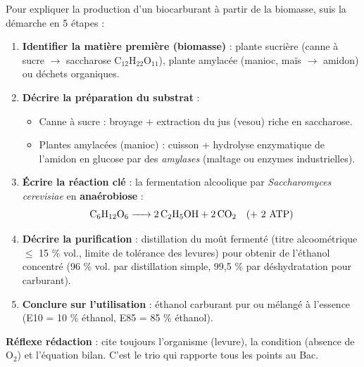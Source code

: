 \documentclass[11pt]{article}
\newcommand{\cle}[1]{{\popxbold\color{popdark}#1}}
\begin{document}
\begin{methode}
Pour expliquer la production d'un biocarburant à partir de la biomasse, suis la démarche en 5 étapes :
\begin{enumerate}
\item \textbf{Identifier la matière première (biomasse)} : plante sucrière (canne à sucre $\rightarrow$ \cle{saccharose} $\mathrm{C_{12}H_{22}O_{11}}$), plante amylacée (manioc, maïs $\rightarrow$ \cle{amidon}) ou déchets organiques.
\item \textbf{Décrire la préparation du substrat} :
\begin{itemize}
\item Canne à sucre : broyage + extraction du jus (vesou) riche en saccharose.
\item Plantes amylacées (manioc) : cuisson + \cle{hydrolyse} enzymatique de l'amidon en glucose par des \emph{amylases} (maltage ou enzymes industrielles).
\end{itemize}
\item \textbf{Écrire la réaction clé} : la \cle{fermentation alcoolique} par \emph{Saccharomyces cerevisiae} en \textbf{anaérobiose} :
\[ \ce{C6H12O6 -> 2 C2H5OH + 2 CO2} \quad (\text{+ 2 ATP}) \]
\item \textbf{Décrire la purification} : distillation du moût fermenté (titre alcoométrique $\le$ 15 \% vol., limite de tolérance des levures) pour obtenir de l'éthanol concentré (96 \% vol. par distillation simple, 99,5 \% par déshydratation pour carburant).
\item \textbf{Conclure sur l'utilisation} : éthanol carburant pur ou mélangé à l'essence (E10 = 10 \% éthanol, E85 = 85 \% éthanol).
\end{enumerate}
\textbf{Réflexe rédaction} : cite toujours l'organisme (levure), la condition (absence de $\mathrm{O_2}$) et l'équation bilan. C'est le trio qui rapporte tous les points au Bac.
\end{methode}
\end{document}
